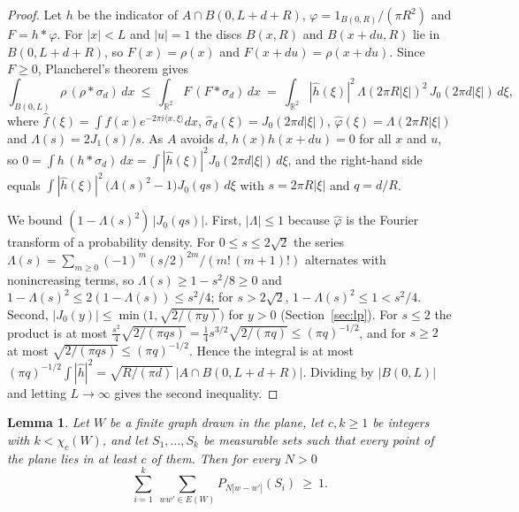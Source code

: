 \documentclass[11pt,a4paper]{amsart}
\newtheorem{lemma}[theorem]{Lemma}
\theoremstyle{definition}
\theoremstyle{remark}
\newcommand{\R}{\mathbb{R}}
\begin{document}
\begin{proof}
Let $h$ be the indicator of $A\cap B(0,L+d+R)$, $\varphi=1_{B(0,R)}/(\pi R^2)$ and $F=h*\varphi$. For $|x|<L$ and
$|u|=1$ the discs $B(x,R)$ and $B(x+du,R)$ lie in $B(0,L+d+R)$, so $F(x)=\rho(x)$ and $F(x+du)=\rho(x+du)$. Since
$F\ge0$, Plancherel's theorem gives
\[
\int_{B(0,L)}\rho\,(\rho*\sigma_d)\,dx\ \le\ \int_{\R^2}F\,(F*\sigma_d)\,dx
\ =\ \int_{\R^2}|\hat h(\xi)|^2\,\Lambda(2\pi R|\xi|)^2\,J_0(2\pi d|\xi|)\,d\xi,
\]
where $\hat f(\xi)=\int f(x)e^{-2\pi i\langle x,\xi\rangle}dx$, $\hat\sigma_d(\xi)=J_0(2\pi d|\xi|)$,
$\hat\varphi(\xi)=\Lambda(2\pi R|\xi|)$ and $\Lambda(s)=2J_1(s)/s$. As $A$ avoids $d$, $h(x)h(x+du)=0$ for all $x$
and $u$, so $0=\int h\,(h*\sigma_d)\,dx=\int|\hat h(\xi)|^2J_0(2\pi d|\xi|)\,d\xi$, and the right-hand side equals
$\int|\hat h(\xi)|^2\,\bigl(\Lambda(s)^2-1\bigr)J_0(qs)\,d\xi$ with $s=2\pi R|\xi|$ and $q=d/R$.

We bound $(1-\Lambda(s)^2)\,|J_0(qs)|$. First, $|\Lambda|\le1$ because $\hat\varphi$ is the Fourier transform of a
probability density. For $0\le s\le2\sqrt2$ the series $\Lambda(s)=\sum_{m\ge0}(-1)^m(s/2)^{2m}/(m!\,(m+1)!)$
alternates with nonincreasing terms, so $\Lambda(s)\ge1-s^2/8\ge0$ and $1-\Lambda(s)^2\le2(1-\Lambda(s))\le s^2/4$;
for $s>2\sqrt2$, $1-\Lambda(s)^2\le1<s^2/4$. Second, $|J_0(y)|\le\min\bigl(1,\sqrt{2/(\pi y)}\bigr)$ for $y>0$
(Section~\ref{sec:lp}). For $s\le2$ the product is at most
$\tfrac{s^2}4\sqrt{2/(\pi qs)}=\tfrac14s^{3/2}\sqrt{2/(\pi q)}\le(\pi q)^{-1/2}$, and for $s\ge2$ at most
$\sqrt{2/(\pi qs)}\le(\pi q)^{-1/2}$. Hence the integral is at most
$(\pi q)^{-1/2}\int|\hat h|^2=\sqrt{R/(\pi d)}\,|A\cap B(0,L+d+R)|$. Dividing by $|B(0,L)|$ and letting $L\to\infty$
gives the second inequality.
\end{proof}

\begin{lemma}\label{lem:multifold}
Let $W$ be a finite graph drawn in the plane, let $c,k\ge1$ be integers with $k<\chi_c(W)$, and let
$S_1,\dots,S_k$ be measurable sets such that every point of the plane lies in at least $c$ of them. Then for every
$N>0$
\[
\sum_{i=1}^k\ \sum_{ww'\in E(W)}P_{N|w-w'|}(S_i)\ \ge\ 1 .
\]
\end{lemma}
\end{document}

